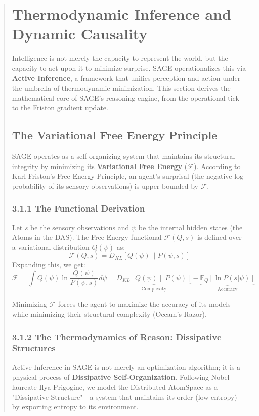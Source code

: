 \documentclass[10pt,twocolumn,letterpaper]{article}
\begin{document}
\begin{abstract}
\section{Thermodynamic Inference and Dynamic Causality}

Intelligence is not merely the capacity to represent the world, but the capacity to act upon it to minimize surprise. SAGE operationalizes this via \textbf{Active Inference}, a framework that unifies perception and action under the umbrella of thermodynamic minimization. This section derives the mathematical core of SAGE's reasoning engine, from the operational tick to the Friston gradient update.

\subsection{The Variational Free Energy Principle}

SAGE operates as a self-organizing system that maintains its structural integrity by minimizing its \textbf{Variational Free Energy} ($\mathcal{F}$). According to Karl Friston’s Free Energy Principle, an agent’s surprisal (the negative log-probability of its sensory observations) is upper-bounded by $\mathcal{F}$.

\subsubsection{3.1.1 The Functional Derivation}
Let $s$ be the sensory observations and $\psi$ be the internal hidden states (the Atoms in the DAS). The Free Energy functional $\mathcal{F}(Q, s)$ is defined over a variational distribution $Q(\psi)$ as:
$$ \mathcal{F}(Q, s) = D_{KL}[Q(\psi) \| P(\psi, s)] $$
Expanding this, we get:
$$ \mathcal{F} = \int Q(\psi) \ln \frac{Q(\psi)}{P(\psi, s)} d\psi = \underbrace{D_{KL}[Q(\psi) \| P(\psi)]}_{\text{Complexity}} - \underbrace{\mathbb{E}_Q[\ln P(s | \psi)]}_{\text{Accuracy}} $$

Minimizing $\mathcal{F}$ forces the agent to maximize the accuracy of its models while minimizing their structural complexity (Occam's Razor).

\subsubsection{3.1.2 The Thermodynamics of Reason: Dissipative Structures}
Active Inference in SAGE is not merely an optimization algorithm; it is a physical process of \textbf{Dissipative Self-Organization}. Following Nobel laureate Ilya Prigogine, we model the Distributed AtomSpace as a "Dissipative Structure"—a system that maintains its order (low entropy) by exporting entropy to its environment.


\end{abstract}
\end{document}
